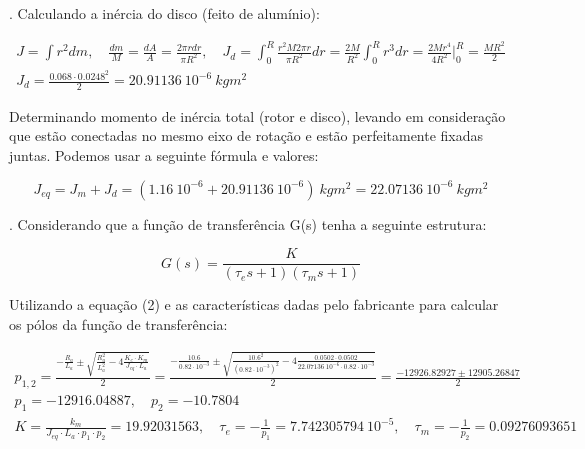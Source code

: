 \documentclass[10pt]{article}
\begin{document}
. Calculando a inércia do disco (feito de alumínio):

\begin{equation}
\begin{aligned}
    J = \int r^2 dm
    ,\quad \frac{dm}{M} = \frac{dA}{A} = \frac{2 \pi r dr}{\pi R^2}
    ,\quad J_d = \int_{0}^{R} \frac{r^2 M 2 \pi r}{\pi R^2} dr
    = \frac{2M}{R^2} \int_{0}^{R} r^3 dr
    = \frac{2Mr^4}{4R^2} \Bigg|_{0}^{R}
    = \frac{MR^2}{2} \\
    J_d = \frac{0.068 \cdot 0.0248^2}{2} = 20.91136 \ 10^{-6} \ kgm^2
\end{aligned}
\end{equation}

\quad Determinando momento de inércia total (rotor e disco),
levando em consideração que estão conectadas no mesmo eixo de rotação e
estão perfeitamente fixadas juntas. Podemos usar a seguinte fórmula e valores:

\begin{equation}
    J_{eq} = J_m + J_d = (1.16 \ 10^{-6} + 20.91136 \ 10^{-6}) \ kgm^2
    = 22.07136 \ 10^{-6} \ kgm^2
\end{equation}

. Considerando que a função de transferência G(s) tenha a seguinte estrutura:

\begin{equation}
    G(s) = \frac{K}{(\tau_e s + 1)(\tau_m s + 1)}
\end{equation}

\quad Utilizando a equação (2) e as características dadas pelo fabricante para calcular
os pólos da função de transferência:

\begin{equation}
\begin{aligned}
    p_{1,2} = \frac{-\frac{R_a}{L_a} \pm \sqrt{\frac{R_a^2}{L_a^2} - 4\frac{K_e \cdot K_m}{J_{eq} \cdot L_a}}}{2}
    = \frac{-\frac{10.6}{0.82 \cdot 10^{-3}} \pm \sqrt{\frac{10.6^2}{(0.82 \cdot 10^{-3})^2} - 4\frac{0.0502 \cdot 0.0502}{22.07136 \ 10^{-6} \cdot 0.82 \cdot 10^{-3}}}}{2}
    = \frac{-12926.82927 \pm 12905.26847}{2} \\
    p_1 = -12916.04887, \quad p_2 = -10.7804 \\
    K = \frac{k_m}{J_{eq} \cdot L_a \cdot p_1 \cdot p_2} = 19.92031563, \quad \tau_e = -\frac{1}{p_1} = 7.742305794 \ 10^{-5}, \quad \tau_m = -\frac{1}{p_2} = 0.09276093651
\end{aligned}
\end{equation}
\end{document}
